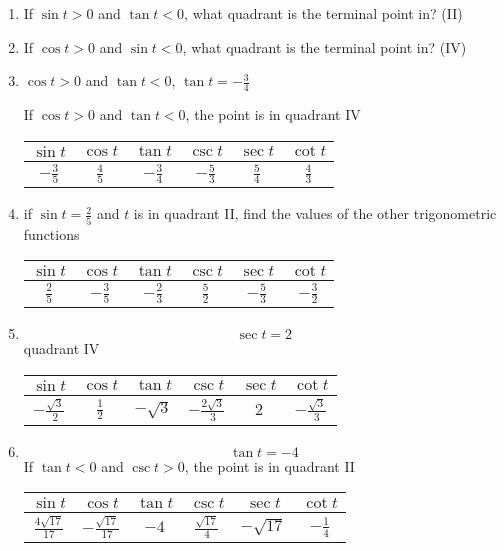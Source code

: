 \documentclass{exam}
\begin{document}
\begin{enumerate}
    \item If $\sin t > 0$ and $\tan t < 0$, what quadrant is the terminal point in? (II)

    \item If $\cos t > 0$ and $\sin t < 0$, what quadrant is the terminal point in? (IV)

    \item
      $\cos t > 0$ and $\tan t < 0$, $\tan t = - \frac{3}{4}$


      If $\cos t > 0$ and $\tan t < 0$, the point is in quadrant IV

      \begin{tabular}[H]{cccccc}
        \toprule
        $\sin t$       & $\cos t$      & $\tan t$       & $\csc t$       & $\sec t$      & $\cot t$ \\
        \midrule
        $-\frac{3}{5}$ & $\frac{4}{5}$ & $-\frac{3}{4}$ & $-\frac{5}{3}$ & $\frac{5}{4}$ & $\frac{4}{3}$ \\
        \bottomrule
      \end{tabular}

    \item if $\sin t = \frac{2}{5}$ and $t$ is in quadrant II, find the values of the other trigonometric functions

      \begin{tabular}[H]{cccccc}
        \toprule
        $\sin t$      & $\cos t$        & $\tan t$       & $\csc t$      & $\sec t$       & $\cot t$ \\
        \midrule
        $\frac{2}{5}$ & $- \frac{3}{5}$ & $-\frac{2}{3}$ & $\frac{5}{2}$ & $-\frac{5}{3}$ & $-\frac{3}{2}$ \\
        \bottomrule
      \end{tabular}

    \item
      \[
        \sec t = 2
      \]
      quadrant IV

      \begin{tabular}[H]{cccccc}
        \toprule
        $\sin t$              & $\cos t$      & $\tan t$    & $\csc t$                & $\sec t$ & $\cot t$ \\
        \midrule
        $-\frac{\sqrt{3}}{2}$ & $\frac{1}{2}$ & $-\sqrt{3}$ & $-\frac{2 \sqrt{3}}{3}$ & $2$      & $-\frac{\sqrt{3}}{3}$ \\
        \bottomrule
      \end{tabular}


    \item
      \[
        \tan t = - 4
      \]
      If $\tan t < 0$ and $\csc t > 0$, the point is in quadrant II

      \begin{tabular}[H]{cccccc}
        \toprule
        $\sin t$                 & $\cos t$                & $\tan t$ & $\csc t$              & $\sec t$     & $\cot t$ \\
        \midrule
        $\frac{4 \sqrt{17}}{17}$ & $-\frac{\sqrt{17}}{17}$ & $-4$     & $\frac{\sqrt{17}}{4}$ & $-\sqrt{17}$ & $-\frac{1}{4}$ \\
        \bottomrule
      \end{tabular}

  \end{enumerate}
\end{document}
